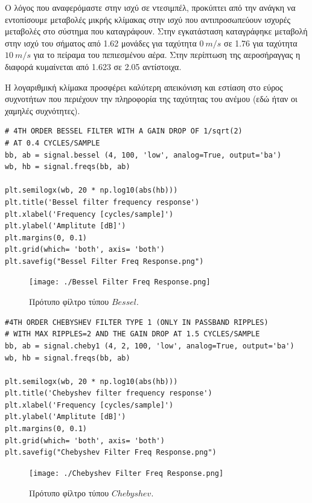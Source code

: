 \documentclass[breaklines=true, 12pt]{article}
\begin{document}
{{{Ο λόγος που αναφερόμαστε στην ισχύ σε ντεσιμπέλ, προκύπτει από την ανάγκη
να εντοπίσουμε μεταβολές μικρής κλίμακας στην ισχύ που αντιπροσωπεύουν
ισχυρές μεταβολές στο σύστημα που καταγράφουν. Στην εγκατάσταση
καταγράφηκε μεταβολή στην ισχύ του σήματος από 1.62 μονάδες για ταχύτητα \(0\ m/s\)
σε 1.76 για ταχύτητα \(10\ m/s\) για το πείραμα του πεπιεσμένου αέρα. Στην
περίπτωση της αεροσήραγγας η διαφορά κυμαίνεται από 1.623 σε 2.05 αντίστοιχα.

Η λογαριθμική κλίμακα προσφέρει καλύτερη απεικόνιση και εστίαση στο εύρος
συχνοτήτων που περιέχουν την πληροφορία της ταχύτητας του ανέμου (εδώ
ήταν οι χαμηλές συχνότητες).

\begin{verbatim}
# 4TH ORDER BESSEL FILTER WITH A GAIN DROP OF 1/sqrt(2)
# AT 0.4 CYCLES/SAMPLE
bb, ab = signal.bessel (4, 100, 'low', analog=True, output='ba')
wb, hb = signal.freqs(bb, ab)

plt.semilogx(wb, 20 * np.log10(abs(hb)))
plt.title('Bessel filter frequency response')
plt.xlabel('Frequency [cycles/sample]')
plt.ylabel('Amplitute [dB]')
plt.margins(0, 0.1)
plt.grid(which= 'both', axis= 'both')
plt.savefig("Bessel Filter Freq Response.png")
\end{verbatim}

\begin{figure}[htbp]
\centering
\texttt{[image: ./Bessel Filter Freq Response.png]}
\caption{Πρότυπο φίλτρο τύπου \(Bessel\).}
\end{figure}

\begin{verbatim}
#4TH ORDER CHEBYSHEV FILTER TYPE 1 (ONLY IN PASSBAND RIPPLES)
# WITH MAX RIPPLES=2 AND THE GAIN DROP AT 1.5 CYCLES/SAMPLE
bb, ab = signal.cheby1 (4, 2, 100, 'low', analog=True, output='ba')
wb, hb = signal.freqs(bb, ab)

plt.semilogx(wb, 20 * np.log10(abs(hb)))
plt.title('Chebyshev filter frequency response')
plt.xlabel('Frequency [cycles/sample]')
plt.ylabel('Amplitute [dB]')
plt.margins(0, 0.1)
plt.grid(which= 'both', axis= 'both')
plt.savefig("Chebyshev Filter Freq Response.png")
\end{verbatim}

\begin{figure}[htbp]
\centering
\texttt{[image: ./Chebyshev Filter Freq Response.png]}
\caption{Πρότυπο φίλτρο τύπου \(Chebyshev\).}
\end{figure}

}}}
\end{document}

